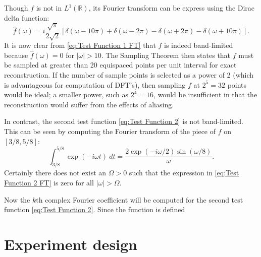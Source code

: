 \documentclass[12pt]{article}
\begin{document}
Though $f$ is not in $L^1(\mathbb{R})$, its Fourier transform can be express using the Dirac delta function:
\begin{equation}
\widehat{f}(\omega) = i\frac{\sqrt{\pi}}{2\sqrt{2}}\left[\delta(\omega - 10\pi) +\delta(\omega - 2\pi) - \delta(\omega + 2\pi) - \delta(\omega + 10\pi)\right].
\label{eq:Test Function 1 FT}
\end{equation}
It is now clear from \eqref{eq:Test Function 1 FT} that $f$ is indeed band-limited because $\widehat{f}(\omega) = 0$ for $|\omega| > 10$. The Sampling Theorem then states that $f$ must be sampled at greater than 20 equispaced points per unit interval for exact reconstruction. If the number of sample points is selected as a power of 2 (which is advantageous for computation of DFT's), then sampling $f$ at $2^5 = 32$ points would be ideal; a smaller power, such as $2^4 = 16$, would be insufficient in that the reconstruction would suffer from the effects of aliasing. \par 
In contrast, the second test function \eqref{eq:Test Function 2} is not band-limited. This can be seen by computing the Fourier transform of the piece of $f$ on $[3/8,5/8]$:
\begin{equation} 
\int_{3/8}^{5/8} \exp(-i\omega{t}) \: dt = \frac{2\exp(-i\omega/2)\sin(\omega/8)}{\omega}.
\label{eq:Test Function 2 FT}
\end{equation}
Certainly there does not exist an $\Omega > 0$ such that the expression in \eqref{eq:Test Function 2 FT} is zero for all $|\omega| > \Omega$. 

Now the $k$th complex Fourier coefficient will be computed for the second test function \eqref{eq:Test Function 2}. Since the function is defined



\section{Experiment design} \label{sec:Experiment design}
\end{document}
